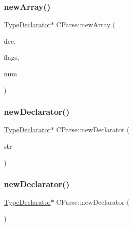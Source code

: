 \mbox{\label{class_c_parse_acbe50e6dd40d382cbc178c4c448d4027}} 
\subsubsection{\texorpdfstring{newArray()}{newArray()}}
{\footnotesize\ttfamily \mbox{\hyperlink{class_type_declarator}{Type\+Declarator}}$\ast$ C\+Parse\+::new\+Array (\begin{DoxyParamCaption}\item[{\mbox{\hyperlink{class_type_declarator}{Type\+Declarator}} $\ast$}]{dec,  }\item[{uint4}]{flags,  }\item[{\mbox{\hyperlink{types_8h_a2db313c5d32a12b01d26ac9b3bca178f}{uintb}} $\ast$}]{num }\end{DoxyParamCaption})}

\mbox{\label{class_c_parse_a98a9a8a0c3c277a80ad6655be29bc386}} 
\subsubsection{\texorpdfstring{newDeclarator()}{newDeclarator()}\hspace{0.1cm}{\footnotesize\ttfamily [1/2]}}
{\footnotesize\ttfamily \mbox{\hyperlink{class_type_declarator}{Type\+Declarator}}$\ast$ C\+Parse\+::new\+Declarator (\begin{DoxyParamCaption}\item[{string $\ast$}]{str }\end{DoxyParamCaption})}

\mbox{\label{class_c_parse_a8e8397c0be82ebe4bb75b23df8c79c01}} 
\subsubsection{\texorpdfstring{newDeclarator()}{newDeclarator()}\hspace{0.1cm}{\footnotesize\ttfamily [2/2]}}
{\footnotesize\ttfamily \mbox{\hyperlink{class_type_declarator}{Type\+Declarator}}$\ast$ C\+Parse\+::new\+Declarator (\begin{DoxyParamCaption}\item[{void}]{ }\end{DoxyParamCaption})}

